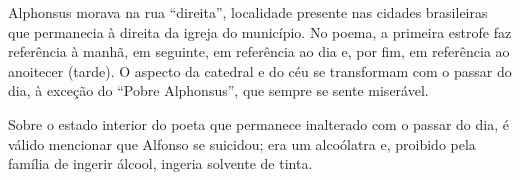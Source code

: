 Alphonsus morava na rua ``direita'', localidade presente nas cidades brasileiras que permanecia à direita da igreja do município. No poema, a primeira estrofe faz referência à manhã, em seguinte, em referência ao dia e, por fim, em referência ao anoitecer (tarde). O aspecto da catedral e do céu se transformam com o passar do dia, à exceção do ``Pobre Alphonsus'', que sempre se sente miserável.

Sobre o estado interior do poeta que permanece inalterado com o passar do dia, é válido mencionar que Alfonso se suicidou; era um alcoólatra e, proibido pela família de ingerir álcool, ingeria solvente de tinta.